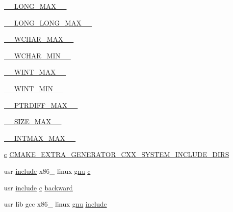 \begin{DoxyCompactItemize}
\item 
\hyperlink{CMakeCache_8txt_a9efbe01f7e7b66cbdac106fb51e2f65f}{\+\_\+\+\_\+\+L\+O\+N\+G\+\_\+\+M\+A\+X\+\_\+\+\_\+}
\item 
\hyperlink{CMakeCache_8txt_ade7a297151900f13d47b71e6a9dda0a1}{\+\_\+\+\_\+\+L\+O\+N\+G\+\_\+\+L\+O\+N\+G\+\_\+\+M\+A\+X\+\_\+\+\_\+}
\item 
\hyperlink{CMakeCache_8txt_ab06c84ef26aaf126084f60730505b6b4}{\+\_\+\+\_\+\+W\+C\+H\+A\+R\+\_\+\+M\+A\+X\+\_\+\+\_\+}
\item 
\hyperlink{CMakeCache_8txt_ab2394184364567c4286a32eec574295e}{\+\_\+\+\_\+\+W\+C\+H\+A\+R\+\_\+\+M\+I\+N\+\_\+\+\_\+}
\item 
\hyperlink{CMakeCache_8txt_ade9fb9056c1b3e7f9417478f12ac5452}{\+\_\+\+\_\+\+W\+I\+N\+T\+\_\+\+M\+A\+X\+\_\+\+\_\+}
\item 
\hyperlink{CMakeCache_8txt_a0101eb15159977cbfe763d0d71a7023f}{\+\_\+\+\_\+\+W\+I\+N\+T\+\_\+\+M\+I\+N\+\_\+\+\_\+}
\item 
\hyperlink{CMakeCache_8txt_a047880d1824d5ce75ac17952c273fcc5}{\+\_\+\+\_\+\+P\+T\+R\+D\+I\+F\+F\+\_\+\+M\+A\+X\+\_\+\+\_\+}
\item 
\hyperlink{CMakeCache_8txt_ad4abf877d7a79e3d1d13494ce6d64d73}{\+\_\+\+\_\+\+S\+I\+Z\+E\+\_\+\+M\+A\+X\+\_\+\+\_\+}
\item 
\hyperlink{CMakeCache_8txt_a6b068320140ebfbbeaa001c18465ea9e}{\+\_\+\+\_\+\+I\+N\+T\+M\+A\+X\+\_\+\+M\+A\+X\+\_\+\+\_\+}
\item 
\hyperlink{html_2jquery_8js_abce695e0af988ece0826d9ad59b8160d}{c} \hyperlink{CMakeCache_8txt_ae84758144b16fbed96a3e6ea5781d3ad}{C\+M\+A\+K\+E\+\_\+\+E\+X\+T\+R\+A\+\_\+\+G\+E\+N\+E\+R\+A\+T\+O\+R\+\_\+\+C\+X\+X\+\_\+\+S\+Y\+S\+T\+E\+M\+\_\+\+I\+N\+C\+L\+U\+D\+E\+\_\+\+D\+I\+RS}
\item 
usr \hyperlink{CMakeCache_8txt_a986ccfc90e04633694fe6cff5472be19}{include} x86\+\_ linux \hyperlink{CMakeCache_8txt_acb61b5fec09bcc7d3b88bf1109612ea6}{gnu} \hyperlink{CMakeCache_8txt_aac1d6a1710812201527c735f7c6afbaa}{c}
\item 
usr \hyperlink{CMakeCache_8txt_a986ccfc90e04633694fe6cff5472be19}{include} \hyperlink{html_2jquery_8js_abce695e0af988ece0826d9ad59b8160d}{c} \hyperlink{CMakeCache_8txt_a4e00b9c657cdeb7b14ea0c43097dcecc}{backward}
\item 
usr lib gcc x86\+\_ linux \hyperlink{CMakeCache_8txt_acb61b5fec09bcc7d3b88bf1109612ea6}{gnu} \hyperlink{CMakeCache_8txt_a986ccfc90e04633694fe6cff5472be19}{include}
\item 

\end{DoxyCompactItemize}
